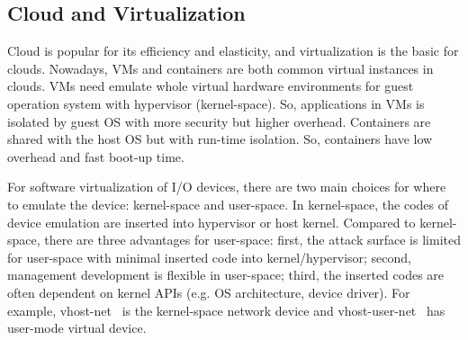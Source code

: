 \subsection{Cloud and Virtualization}
Cloud is popular for its efficiency and elasticity, and virtualization is the basic for clouds. Nowadays, VMs and containers are both common virtual instances in clouds. VMs need emulate whole virtual hardware environments for guest operation system with hypervisor (kernel-space). So, applications in VMs is isolated by guest OS with more security but higher overhead. Containers are shared with the host OS but with run-time isolation. So, containers have low overhead and fast boot-up time.

For software virtualization of I/O devices, there are two main choices for where to emulate the device: kernel-space and user-space. In kernel-space, the codes of device emulation are inserted into hypervisor or host kernel. Compared to kernel-space, there are three advantages for user-space: first, the attack surface is limited for user-space with minimal inserted code into kernel/hypervisor; second, management development is flexible in user-space; third, the inserted codes are often dependent on kernel APIs (e.g. OS architecture, device driver). For example, vhost-net~\cite{vhost-net} is the kernel-space network device and vhost-user-net~\cite{vhost-user-net} has user-mode virtual device. 


